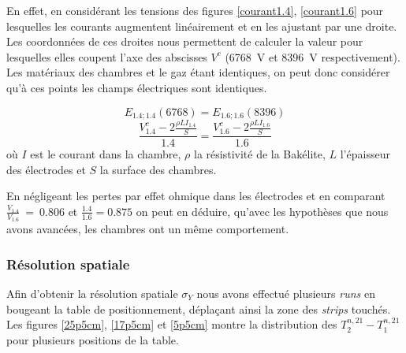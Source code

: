 En effet, en considérant les tensions des figures \ref{courant1.4}, \ref{courant1.6} pour lesquelles les courants augmentent linéairement et en les ajustant par une droite. Les coordonnées de ces droites nous permettent de calculer la valeur pour lesquelles elles coupent l'axe des abscisses $V^c$ (\SI{6768}{\volt} et \SI{8396}{\volt} respectivement). Les matériaux des chambres et le gaz étant identiques, on peut donc considérer qu'à ces points les champs électriques sont identiques.

\begin{equation}
E_{\num{1.4};\num{1.4}}\left( 6768 \right)=E_{\num{1.6};\num{1.6}}\left( 8396 \right)
\end{equation} 
\begin{equation}
\frac{V^c_{1.4}-2\frac{\rho L I_{1.4}}{S} }{1.4}=\frac{V^c_{1.6}-2\frac{\rho L I_{1.6}}{S} }{1.6}
\end{equation} 
où $I$ est le courant dans la chambre, $\rho$ la résistivité de la Bakélite, $L$ l'épaisseur des électrodes et $S$ la surface des chambres.

En négligeant les pertes par effet ohmique dans les électrodes et en comparant $\frac{V_{1.4}}{V_{1.6}}~=~\num{0.806}$ et $\frac{1.4}{1.6}=\num{0.875}$ on peut en déduire, qu'avec les hypothèses que nous avons avancées, les chambres ont un même comportement.

\subsubsection{Résolution spatiale}

Afin d'obtenir la résolution spatiale $\sigma_{Y}$ nous avons effectué plusieurs \textit{runs} en bougeant la table de positionnement, déplaçant ainsi la zone des \textit{strips} touchés. Les figures \ref{25p5cm}, \ref{17p5cm} et \ref{5p5cm} montre la distribution des $T^{n,21}_2-T^{n,21}_1$ pour plusieurs positions de la table. 

